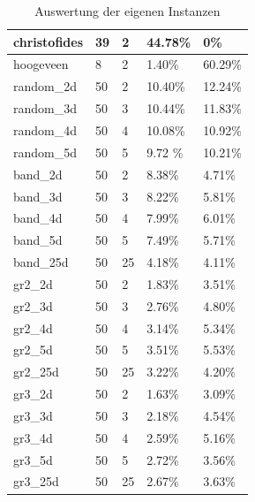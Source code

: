 \documentclass[12pt]{beamer}
\begin{document}
\begin{frame}
\begin{table}[H]
\begin{tabular}{| p{1.0cm} | p{1.0cm} | p{1.5cm} | p{1.5cm} | p{1.5cm} |}
                    christofides    & 39    & 2     &  44.78\%  &      0\%           \\ \hline
                    hoogeveen       & 8     & 2     &   1.40\%  &  60.29\%       \\ \hline
                    random\_2d      & 50    & 2     &  10.40\%  &  12.24\%       \\ \hline
                    random\_3d      & 50    & 3     &  10.44\%  &  11.83\%       \\ \hline
                    random\_4d      & 50    & 4     &  10.08\%  &  10.92\%        \\ \hline
                    random\_5d      & 50    & 5     &  9.72 \%  &  10.21\%        \\ \hline
                    band\_2d        & 50    & 2     &   8.38\%  &   4.71\%        \\ \hline
                    band\_3d        & 50    & 3     &   8.22\%  &   5.81\%        \\ \hline
                    band\_4d        & 50    & 4     &   7.99\%  &   6.01\%        \\ \hline
                    band\_5d        & 50    & 5     &   7.49\%  &   5.71\%       \\ \hline
                    band\_25d       & 50    & 25    &   4.18\%  &   4.11\%       \\ \hline
                    gr2\_2d         & 50    & 2     &   1.83\%  &   3.51\%        \\ \hline
                    gr2\_3d         & 50    & 3     &   2.76\%  &   4.80\%        \\ \hline
                    gr2\_4d         & 50    & 4     &   3.14\%  &   5.34\%        \\ \hline
                    gr2\_5d         & 50    & 5     &   3.51\%  &   5.53\%       \\ \hline
                    gr2\_25d        & 50    & 25    &   3.22\%  &   4.20\%       \\ \hline
                    gr3\_2d         & 50    & 2     &   1.63\%  &   3.09\%        \\ \hline
                    gr3\_3d         & 50    & 3     &   2.18\%  &   4.54\%        \\ \hline
                    gr3\_4d         & 50    & 4     &   2.59\%  &   5.16\%        \\ \hline
                    gr3\_5d         & 50    & 5     &   2.72\%  &   3.56\%       \\ \hline
                    gr3\_25d        & 50    & 25    &   2.67\%  &   3.63\%       \\ \hline
               \end{tabular}
                \caption{Auswertung der eigenen Instanzen}
                \label{tab:instanz_eigene_instanzen}
        \end{table} 
    \end{frame}
\end{document}
